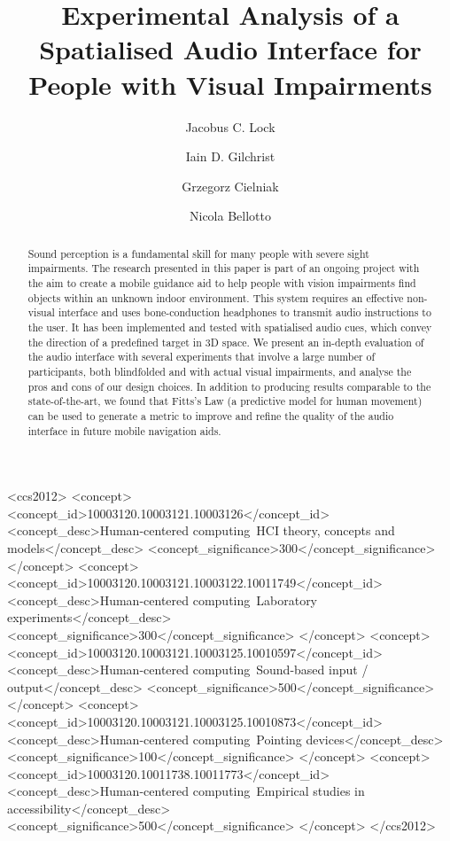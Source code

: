 \documentclass[acmsmall]{acmart}
\begin{document}
\title{Experimental Analysis of a Spatialised Audio Interface for People with Visual Impairments}

\author{Jacobus C. Lock}

\author{Iain D. Gilchrist}

\author{Grzegorz Cielniak}

\author{Nicola Bellotto}

\begin{abstract}
  Sound perception is a fundamental skill for many people with severe sight impairments.
  The research presented in this paper is part of an ongoing project with the aim to create a mobile guidance aid to help people with vision impairments find objects within an unknown indoor environment.
  This system requires an effective non-visual interface and uses bone-conduction headphones to transmit audio instructions to the user.
  It has been implemented and tested with spatialised audio cues, which convey the direction of a predefined target in 3D space.
  We present an in-depth evaluation of the audio interface with several experiments that involve a large number of participants, both blindfolded and with actual visual impairments, and analyse the pros and cons of our design choices.
  In addition to producing results comparable to the state-of-the-art, we found that Fitts's Law (a predictive model for human movement) can be used to generate a metric to improve and refine the quality of the audio interface in future mobile navigation aids. 
\end{abstract}

\begin{CCSXML}
<ccs2012>
<concept>
<concept_id>10003120.10003121.10003126</concept_id>
<concept_desc>Human-centered computing~HCI theory, concepts and models</concept_desc>
<concept_significance>300</concept_significance>
</concept>
<concept>
<concept_id>10003120.10003121.10003122.10011749</concept_id>
<concept_desc>Human-centered computing~Laboratory experiments</concept_desc>
<concept_significance>300</concept_significance>
</concept>
<concept>
<concept_id>10003120.10003121.10003125.10010597</concept_id>
<concept_desc>Human-centered computing~Sound-based input / output</concept_desc>
<concept_significance>500</concept_significance>
</concept>
<concept>
<concept_id>10003120.10003121.10003125.10010873</concept_id>
<concept_desc>Human-centered computing~Pointing devices</concept_desc>
<concept_significance>100</concept_significance>
</concept>
<concept>
<concept_id>10003120.10011738.10011773</concept_id>
<concept_desc>Human-centered computing~Empirical studies in accessibility</concept_desc>
<concept_significance>500</concept_significance>
</concept>
</ccs2012>
\end{CCSXML}
\end{document}
